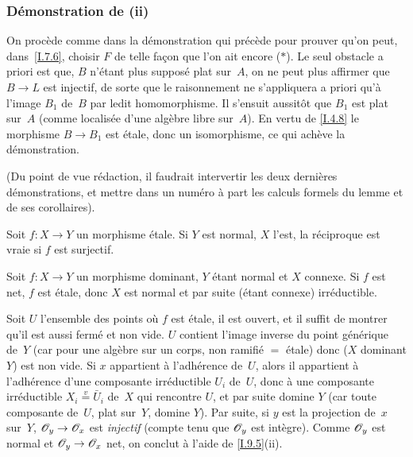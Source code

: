 \subsubsection*{D\'emonstration de \textup{(ii)}}
On
proc\`ede comme dans la d\'emonstration qui pr\'ec\`ede pour
prouver qu'on peut, dans~\ref{I.7.6}, choisir $F$ de telle fa\c con que l'on
ait encore ($*$). Le seul obstacle a priori est que, $B$ n'\'etant
plus suppos\'e plat sur~$A$, on ne peut plus affirmer que $B\to L$
est injectif, de sorte que le raisonnement ne s'appliquera a priori
qu'\`a l'image $B_1$ de~$B$ par ledit homomorphisme. Il s'ensuit
aussit\^ot que $B_1$ est plat sur~$A$ (comme localis\'ee d'une
alg\`ebre libre sur~$A$). En vertu de \ref{I.4.8} le morphisme $B\to B_1$
est \'etale, donc un isomorphisme, ce qui ach\`eve la
d\'emonstration.

(Du point de vue r\'edaction, il faudrait intervertir les deux
derni\`eres d\'emonstrations, et mettre dans un num\'ero \`a
part les calculs formels du lemme et de ses corollaires).

\begin{corollaire}
\label{I.9.10}
Soit $f\colon X\to Y$ un morphisme \'etale. Si $Y$ est normal, $X$
l'est, la r\'eciproque est vraie si $f$ est
surjectif.
\end{corollaire}

\begin{corollaire}
\label{I.9.11}
Soit $f\colon X\to Y$ un morphisme dominant, $Y$ \'etant normal et
$X$ connexe. Si $f$ est net, $f$ est \'etale, donc $X$ est normal
et par suite (\'etant connexe) irr\'eductible.
\end{corollaire}

Soit $U$ l'ensemble des points o\`u $f$ est \'etale, il est
ouvert, et il suffit de montrer qu'il est aussi ferm\'e et non vide.
$U$ contient l'image inverse du point g\'en\'erique de~$Y$ (car
pour une alg\`ebre sur un corps, non ramifi\'e $=$ \'etale) donc
($X$ dominant $Y$) est non vide. Si $x$ appartient \`a
l'adh\'erence de~$U$, alors il appartient \`a l'adh\'erence
d'une composante irr\'eductible $U_i$ de~$U$, donc \`a une
composante irr\'eductible $X_i\overset{v}{=}\bar{U}_i$
de~$X$ qui rencontre $U$, et par suite domine $Y$ (car toute
composante de~$U$, plat sur~$Y$, domine $Y$). Par suite, si $y$ est
la projection de~$x$ sur~$Y$, $\cal{O}_y\to\cal{O}_x$ est
\emph{injectif} (compte tenu que $\cal{O}_y$ est int\`egre). Comme
$\cal{O}_y$ est normal et $\cal{O}_y\to\cal{O}_x$ net, on conclut
\`a l'aide de \ref{I.9.5}(ii).

